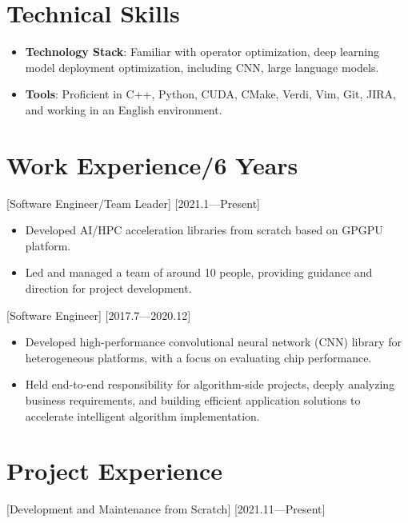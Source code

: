 \documentclass{resume}
\begin{document}
\section{Technical Skills}

\begin{itemize}
  \item \textbf{Technology Stack}: Familiar with operator optimization, deep learning model deployment optimization, including CNN, large language models.
  \item \textbf{Tools}: Proficient in C++, Python, CUDA, CMake, Verdi, Vim, Git, JIRA, and working in an English environment.
\end{itemize}

\section{Work Experience/6 Years}

[Software Engineer/Team Leader]
[2021.1—Present]

\begin{itemize}
  \item Developed AI/HPC acceleration libraries from scratch based on GPGPU platform.
  \item Led and managed a team of around 10 people, providing guidance and direction for project development.
\end{itemize}

[Software Engineer]
[2017.7—2020.12] 

\begin{itemize}
  \item Developed high-performance convolutional neural network (CNN) library for heterogeneous platforms, with a focus on evaluating chip performance.
  \item Held end-to-end responsibility for algorithm-side projects, deeply analyzing business requirements, and building efficient application solutions to accelerate intelligent algorithm implementation.
\end{itemize}

\section{Project Experience}

[Development and Maintenance from Scratch]
[2021.11—Present]
\end{document}
